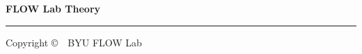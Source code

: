 
\thispagestyle{empty}
\begin{flushleft}
\Huge\bfseries\sffamily FLOW Lab Theory
\end{flushleft}
\noindent\rule{\linewidth}{1pt}
\vspace{8in}
\begin{flushleft}
Copyright \copyright\ \the\year\ BYU FLOW Lab
\end{flushleft}




\setcounter{tocdepth}{0}
\setcounter{secnumdepth}{-1}
\tableofcontents 

